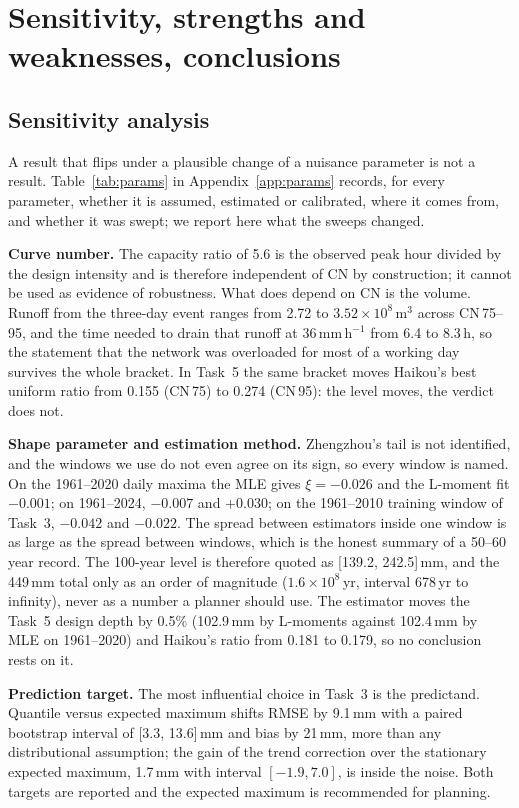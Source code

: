 \section{Sensitivity, strengths and weaknesses, conclusions}\label{sec:eval}

\subsection{Sensitivity analysis}

A result that flips under a plausible change of a nuisance parameter is not a result. Table~\ref{tab:params} in Appendix~\ref{app:params} records, for every parameter, whether it is assumed, estimated or calibrated, where it comes from, and whether it was swept; we report here what the sweeps changed.

\textbf{Curve number.} The capacity ratio of 5.6 is the observed peak hour divided by the design intensity and is therefore independent of CN by construction; it cannot be used as evidence of robustness. What does depend on CN is the volume. Runoff from the three-day event ranges from 2.72 to $3.52\times10^{8}$\,m$^3$ across CN\,75--95, and the time needed to drain that runoff at 36\,mm\,h$^{-1}$ from 6.4 to 8.3\,h, so the statement that the network was overloaded for most of a working day survives the whole bracket. In Task~5 the same bracket moves Haikou's best uniform ratio from 0.155 (CN\,75) to 0.274 (CN\,95): the level moves, the verdict does not.

\textbf{Shape parameter and estimation method.} Zhengzhou's tail is not identified, and the windows we use do not even agree on its sign, so every window is named. On the 1961--2020 daily maxima the MLE gives $\xi=-0.026$ and the L-moment fit $-0.001$; on 1961--2024, $-0.007$ and $+0.030$; on the 1961--2010 training window of Task~3, $-0.042$ and $-0.022$. The spread between estimators inside one window is as large as the spread between windows, which is the honest summary of a 50--60 year record. The 100-year level is therefore quoted as [139.2, 242.5]\,mm, and the 449\,mm total only as an order of magnitude ($1.6\times10^{8}$\,yr, interval 678\,yr to infinity), never as a number a planner should use. The estimator moves the Task~5 design depth by 0.5\% (102.9\,mm by L-moments against 102.4\,mm by MLE on 1961--2020) and Haikou's ratio from 0.181 to 0.179, so no conclusion rests on it.

\textbf{Prediction target.} The most influential choice in Task~3 is the predictand. Quantile versus expected maximum shifts RMSE by 9.1\,mm with a paired bootstrap interval of [3.3, 13.6]\,mm and bias by 21\,mm, more than any distributional assumption; the gain of the trend correction over the stationary expected maximum, 1.7\,mm with interval $[-1.9, 7.0]$, is inside the noise. Both targets are reported and the expected maximum is recommended for planning.

